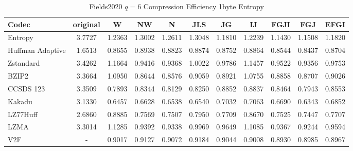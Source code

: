 \documentclass{article}
\begin{document}
\begin{table}[h!]
\centering
\caption{Fields2020 $q=6$ Compression Efficiency 1byte Entropy}
\begin{tabular}{|l|cccccccccc|}
\hline
Codec &  original &      W &     NW &      N &    JLS &     JG &     IJ &   FGJI &    FGJ &   EFGI \\
\hline
Entropy & 3.7727 & 1.2363 & 1.3002 & 1.2611 & 1.3048 & 1.1810 & 1.2239 & 1.1430 & 1.1508 & 1.1820 \\
\hline
Huffman Adaptive &    1.6513 & 0.8655 & 0.8938 & 0.8823 & 0.8874 & 0.8752 & 0.8864 & 0.8544 & 0.8437 & 0.8704 \\
Zstandard        &    3.4262 & 1.1664 & 0.9416 & 0.9368 & 1.0022 & 0.9786 & 1.1457 & 0.9522 & 0.9356 & 0.9753 \\
BZIP2            &    3.3664 & 1.0950 & 0.8644 & 0.8576 & 0.9059 & 0.8921 & 1.0755 & 0.8858 & 0.8707 & 0.9026 \\
CCSDS 123        &    3.3509 & 0.7893 & 0.8344 & 0.8129 & 0.8250 & 0.8852 & 0.8837 & 0.8464 & 0.7943 & 0.8553 \\
Kakadu           &    3.1330 & 0.6457 & 0.6628 & 0.6538 & 0.6540 & 0.7032 & 0.7063 & 0.6690 & 0.6343 & 0.6852 \\
LZ77Huff         &    2.6860 & 0.8885 & 0.7569 & 0.7507 & 0.7950 & 0.7709 & 0.8670 & 0.7525 & 0.7447 & 0.7707 \\
LZMA             &    3.3014 & 1.1285 & 0.9392 & 0.9338 & 0.9969 & 0.9649 & 1.1085 & 0.9367 & 0.9244 & 0.9594 \\
V2F              &    - & 0.9017 & 0.9127 & 0.9072 & 0.9184 & 0.9044 & 0.9008 & 0.8930 & 0.8985 & 0.8967 \\
\hline
\end{tabular}
\end{table}
\end{document}
